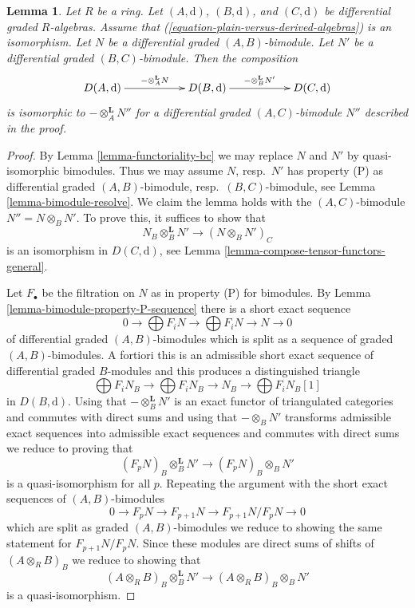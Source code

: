 \documentclass{stacks-project}
\theoremstyle{plain}
\newtheorem{lemma}[subsection]{Lemma}
\theoremstyle{definition}
\theoremstyle{remark}
\numberwithin{equation}{subsection}
\begin{document}
\begin{lemma}
\label{lemma-compose-tensor-functors-general-algebra}
Let $R$ be a ring. Let $(A, \text{d})$, $(B, \text{d})$, and
$(C, \text{d})$ be differential graded $R$-algebras. Assume
that (\ref{equation-plain-versus-derived-algebras}) is an isomorphism.
Let $N$ be a differential graded $(A, B)$-bimodule.
Let $N'$ be a differential graded $(B, C)$-bimodule.
Then the composition
$$
\xymatrix{
D(A, \text{d}) \ar[rr]^{- \otimes_A^\mathbf{L} N} & &
D(B, \text{d}) \ar[rr]^{- \otimes_B^\mathbf{L} N'} & &
D(C, \text{d})
}
$$
is isomorphic to $- \otimes_A^\mathbf{L} N''$ for a differential graded
$(A, C)$-bimodule $N''$ described in the proof.
\end{lemma}

\begin{proof}
By Lemma \ref{lemma-functoriality-bc} we may replace $N$ and $N'$ by
quasi-isomorphic bimodules. Thus we may assume $N$, resp.\ $N'$
has property (P) as differential graded
$(A, B)$-bimodule, resp.\ $(B, C)$-bimodule, see
Lemma \ref{lemma-bimodule-resolve}. We claim the lemma holds
with the $(A, C)$-bimodule $N'' = N \otimes_B N'$.
To prove this, it suffices to show that
$$
N_B \otimes_B^\mathbf{L} N' \longrightarrow (N \otimes_B N')_C
$$
is an isomorphism in $D(C, \text{d})$, see
Lemma \ref{lemma-compose-tensor-functors-general}.

\medskip\noindent
Let $F_\bullet$ be the filtration on $N$ as in property (P) for bimodules.
By Lemma \ref{lemma-bimodule-property-P-sequence}
there is a short exact sequence
$$
0 \to
\bigoplus\nolimits F_iN \to
\bigoplus\nolimits F_iN \to N \to 0
$$
of differential graded $(A, B)$-bimodules which is split as a sequence
of graded $(A, B)$-bimodules. A fortiori this is an admissible short exact
sequence of differential graded $B$-modules and this produces a distinguished
triangle
$$
\bigoplus\nolimits F_iN_B \to
\bigoplus\nolimits F_iN_B \to N_B \to
\bigoplus\nolimits F_iN_B[1]
$$
in $D(B, \text{d})$. Using that $- \otimes_B^\mathbf{L} N'$
is an exact functor of triangulated categories and commutes
with direct sums and using that $- \otimes_B N'$ transforms
admissible exact sequences into admissible exact sequences
and commutes with direct sums we reduce to proving
that
$$
(F_pN)_B \otimes_B^\mathbf{L} N' \longrightarrow (F_pN)_B \otimes_B N'
$$
is a quasi-isomorphism for all $p$. Repeating the argument
with the short exact sequences of $(A, B)$-bimodules
$$
0 \to F_pN \to F_{p + 1}N \to F_{p + 1}N/F_pN \to 0
$$
which are split as graded $(A, B)$-bimodules
we reduce to showing the same statement for $F_{p + 1}N/F_pN$.
Since these modules are direct sums of shifts of $(A \otimes_R B)_B$
we reduce to showing that
$$
(A \otimes_R B)_B \otimes_B^\mathbf{L} N'
\longrightarrow
(A \otimes_R B)_B \otimes_B N'
$$
is a quasi-isomorphism.


\end{proof}
\end{document}
